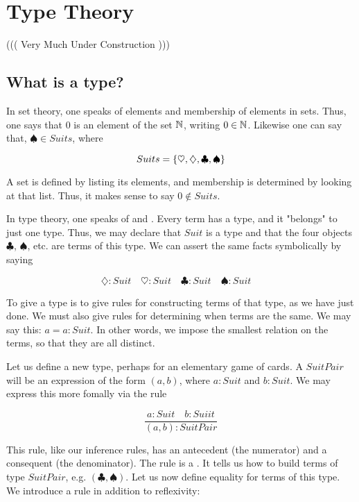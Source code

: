 \begin{mathmacro}
\newcommand{\set}[1]{\{ #1 \}}
\newcommand{\nat}[0]{\mathbb{N}}
\end{mathmacro}

\section{Type Theory}

((( Very Much Under Construction )))

\innertableofcontents

\subsection{What is a type?}



In set theory, one speaks of elements and membership of elements in sets.  Thus, one says that $0$ is an element of the set $\nat$, writing $0 \in \nat$.  Likewise one can say that, $\spadesuit \in Suits$, where 

$$ Suits = \set{\heartsuit, \diamondsuit, \clubsuit, \spadesuit }$$

A set is defined by listing its elements, and membership is determined by looking at that list.  Thus, it makes sense to say $0 \not\in Suits$.  

In type theory, one speaks of  and .  Every term has a type, and it "belongs" to just one type.  Thus, we may declare that $Suit$ is a type and that the four objects $\clubsuit$, $\spadesuit$, etc. are terms of this type.  We can assert the same facts symbolically by saying

$$
\diamondsuit : Suit \quad
\heartsuit : Suit \quad
\clubsuit : Suit \quad
\spadesuit : Suit \quad
$$

To give a type is to give rules for constructing terms of that type, as we have just done.  We must also give rules for determining when terms are the same.  We may say this:  $a = a : Suit$.  In other words, we impose the smallest relation on the terms, so that they are all distinct.

Let us define a new type, perhaps for an elementary game of cards.  A $SuitPair$ will be an expression of the form $(a,b)$, where $a : Suit$ and $b : Suit$.  We may express this more fomally via the rule 

$$
\frac{a : Suit \quad b : Suiit}{(a,b) : SuitPair}
$$

This rule, like our inference rules, has an antecedent (the numerator) and a consequent (the denominator).  The rule is a .  It tells us how to build terms of type $SuitPair$, e.g. $(\clubsuit, \spadesuit)$.  Let us now define equality for terms of this type.  We introduce a rule in addition to reflexivity: 

